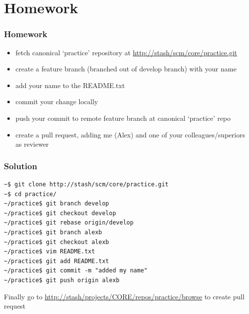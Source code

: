 \documentclass{beamer}
\begin{document}
\section{Homework}

\begin{frame}
    \frametitle{Homework}
    \begin{itemize}
        \item fetch canonical `practice' repository at \url{http://stash/scm/core/practice.git}
        \item create a feature branch (branched out of develop branch) with your name
        \item add your name to the README.txt
        \item commit your change locally
        \item push your commit to remote feature branch at canonical `practice' repo
        \item create a pull request, adding me (Alex) and one of your colleagues/superiors as reviewer
    \end{itemize}
\end{frame}

\begin{frame}[fragile]
    \frametitle{Solution}
    \begin{verbatim}
~$ git clone http://stash/scm/core/practice.git
~$ cd practice/
~/practice$ git branch develop
~/practice$ git checkout develop
~/practice$ git rebase origin/develop
~/practice$ git branch alexb
~/practice$ git checkout alexb
~/practice$ vim README.txt
~/practice$ git add README.txt
~/practice$ git commit -m "added my name"
~/practice$ git push origin alexb
    \end{verbatim}
    Finally go to \url{http://stash/projects/CORE/repos/practice/browse} to create pull request
\end{frame}
\end{document}
